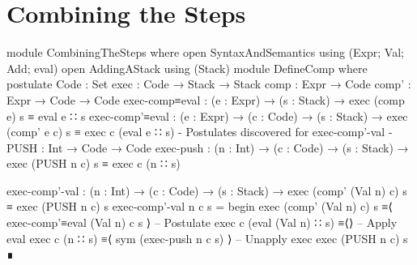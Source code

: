 \documentclass{article}
\begin{document}
\section{Combining the Steps}

\begin{code}
module CombiningTheSteps where
  open SyntaxAndSemantics using (Expr; Val; Add; eval)
  open AddingAStack using (Stack)
  module DefineComp where
    postulate
      Code : Set
      exec : Code → Stack → Stack
      comp : Expr → Code
      comp' : Expr → Code → Code
      exec-comp≡eval : (e : Expr) → (s : Stack)
        → exec (comp e) s ≡ eval e ∷ s
      exec-comp'≡eval : (e : Expr) → (c : Code) → (s : Stack)
        → exec (comp' e c) s ≡ exec c (eval e ∷ s)
      {- Postulates discovered for exec-comp'-val -}
      PUSH : Int → Code → Code
      exec-push : (n : Int) → (c : Code) → (s : Stack)
        → exec (PUSH n c) s ≡ exec c (n ∷ s)

    exec-comp'-val : (n : Int) → (c : Code) → (s : Stack)
      → exec (comp' (Val n) c) s ≡ exec (PUSH n c) s
    exec-comp'-val n c s =
      begin
        exec (comp' (Val n) c) s
      ≡⟨ exec-comp'≡eval (Val n) c s ⟩ -- Postulate
        exec c (eval (Val n) ∷ s)
      ≡⟨⟩ -- Apply eval
        exec c (n ∷ s)
      ≡⟨ sym (exec-push n c s) ⟩ -- Unapply exec
        exec (PUSH n c) s
      ∎
\end{code}
\end{document}
